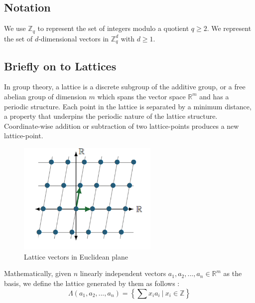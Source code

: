 \documentclass[11pt,
  titlepage=false,
  abstract=on,
]{scrreprt}
\begin{document}
\subsection{Notation}
We use $\mathbb{Z}_q$ to represent the set of integers modulo a quotient $q \geq 2$. We represent the set of $d$-dimensional vectors in $\mathbb{Z}^d_q$
with $d \geq 1$.
\subsection{Briefly on to Lattices}
In group theory, a lattice is a discrete subgroup of the additive group, or a free abelian group of dimension $m$ which spans the vector space $\mathbb{R}^m$ and has a periodic structure. 
Each point in the lattice is separated by a minimum distance, a property that underpins the periodic nature of the lattice structure. Coordinate-wise addition or subtraction of two lattice-points 
produces a new lattice-point.





\begin{figure}[h]
  \centering
  \includegraphics[width=0.6\textwidth]{figures/lattice-with-lattice-vectors.png}
  \caption{Lattice vectors in Euclidean plane \cite{latticesInPQC}}
  \label{fig:LatticeWithLatticeVectors}
\end{figure}

\newpage

Mathematically, given $n$ linearly independent vectors $a_1, a_2,..., a_n \in \mathbb{R}^m$ as the basis, we define the lattice generated by them as follows \cite{latticesIntro2004}:
\begin{equation*}
  \Lambda(a_1, a_2,..., a_n) = \left\{\sum x_ia_i\ |\ x_i \in \mathbb{Z}\right\} 
\end{equation*}
\end{document}
